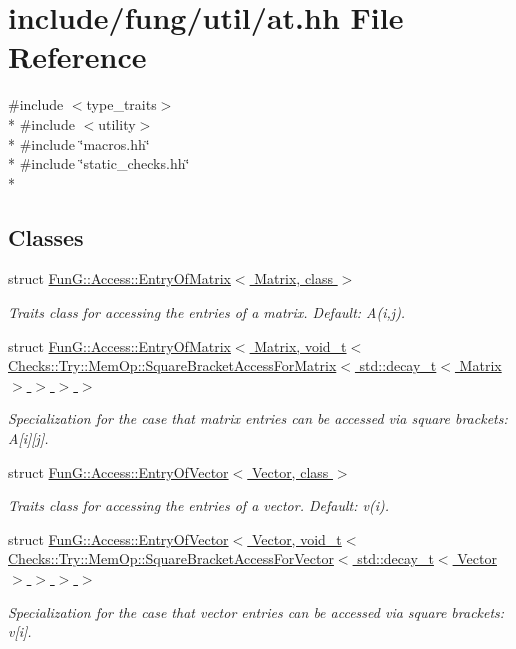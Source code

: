\hypertarget{at_8hh}{}\section{include/fung/util/at.hh File Reference}
\label{at_8hh}
{\ttfamily \#include $<$type\+\_\+traits$>$}\\*
{\ttfamily \#include $<$utility$>$}\\*
{\ttfamily \#include \char`\"{}macros.\+hh\char`\"{}}\\*
{\ttfamily \#include \char`\"{}static\+\_\+checks.\+hh\char`\"{}}\\*
\subsection*{Classes}
\begin{DoxyCompactItemize}
\item 
struct \hyperlink{structFunG_1_1Access_1_1EntryOfMatrix}{Fun\+G\+::\+Access\+::\+Entry\+Of\+Matrix$<$ Matrix, class $>$}
\begin{DoxyCompactList}\small\item\em Traits class for accessing the entries of a matrix. Default\+: A(i,j). \end{DoxyCompactList}\item 
struct \hyperlink{structFunG_1_1Access_1_1EntryOfMatrix_3_01Matrix_00_01void__t_3_01Checks_1_1Try_1_1MemOp_1_1Squa64f8314119f1d5e2cd3b3016365cec8d}{Fun\+G\+::\+Access\+::\+Entry\+Of\+Matrix$<$ Matrix, void\+\_\+t$<$ Checks\+::\+Try\+::\+Mem\+Op\+::\+Square\+Bracket\+Access\+For\+Matrix$<$ std\+::decay\+\_\+t$<$ Matrix $>$ $>$ $>$ $>$}
\begin{DoxyCompactList}\small\item\em Specialization for the case that matrix entries can be accessed via square brackets\+: A\mbox{[}i\mbox{]}\mbox{[}j\mbox{]}. \end{DoxyCompactList}\item 
struct \hyperlink{structFunG_1_1Access_1_1EntryOfVector}{Fun\+G\+::\+Access\+::\+Entry\+Of\+Vector$<$ Vector, class $>$}
\begin{DoxyCompactList}\small\item\em Traits class for accessing the entries of a vector. Default\+: v(i). \end{DoxyCompactList}\item 
struct \hyperlink{structFunG_1_1Access_1_1EntryOfVector_3_01Vector_00_01void__t_3_01Checks_1_1Try_1_1MemOp_1_1Squaa9733f1e90025a89b1e2cfa7d151d247}{Fun\+G\+::\+Access\+::\+Entry\+Of\+Vector$<$ Vector, void\+\_\+t$<$ Checks\+::\+Try\+::\+Mem\+Op\+::\+Square\+Bracket\+Access\+For\+Vector$<$ std\+::decay\+\_\+t$<$ Vector $>$ $>$ $>$ $>$}
\begin{DoxyCompactList}\small\item\em Specialization for the case that vector entries can be accessed via square brackets\+: v\mbox{[}i\mbox{]}. \end{DoxyCompactList}\end{DoxyCompactItemize}
